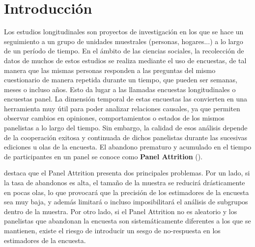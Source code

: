 \chapter{Introducción}
\label{chapter:introduccion}

Los estudios longitudinales son proyectos de investigación en los que se hace un seguimiento a un grupo de unidades muestrales (personas, hogares...) a lo largo de un período de tiempo. En el ámbito de las ciencias sociales, la recolección de datos de muchos de estos estudios se realiza mediante el uso de encuestas, de tal manera que las mismas personas responden a las preguntas del mismo cuestionario de manera repetida durante un tiempo, que pueden ser semanas, meses o incluso años. Esto da lugar a las llamadas encuestas longitudinales o encuestas panel. La dimensión temporal de estas encuestas las convierten en una herramienta muy útil para poder analizar relaciones causales, ya que permiten observar cambios en opiniones, comportamientos o estados de los mismos panelistas a lo largo del tiempo. Sin embargo, la calidad de esos análisis depende de la cooperación exitosa y continuada de dichos panelistas durante las sucesivas ediciones u olas de la encuesta. El abandono prematuro y acumulado en el tiempo de participantes en un panel se conoce como \textbf{Panel Attrition} (\cite{watson2009identifying}).

\cite{lynn2018tackling} destaca que el Panel Attrition presenta dos principales problemas. Por un lado, si la tasa de abandonos es alta, el tamaño de la muestra se reducirá drásticamente en pocas olas, lo que provocará que la precisión de los estimadores de la encuesta sea muy baja, y además limitará o incluso imposibilitará el análisis de subgrupos dentro de la muestra. Por otro lado, si el Panel Attrition no es aleatorio y los panelistas que abandonan la encuesta son sistemáticamente diferentes a los que se mantienen, existe el riesgo de introducir un sesgo de no-respuesta en los estimadores de la encuesta.

